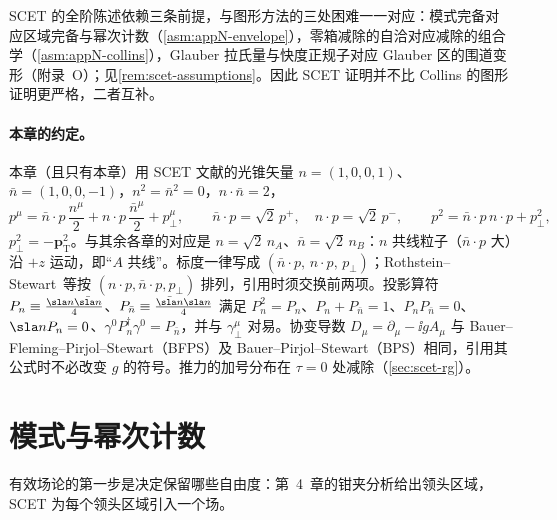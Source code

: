 SCET 的全阶陈述依赖三条前提，与图形方法的三处困难一一对应：模式完备对应区域完备与幂次计数（\cref{asm:appN-envelope}），零箱减除的自洽对应减除的组合学（\cref{asm:appN-collins}），Glauber 拉氏量与快度正规子对应 Glauber 区的围道变形（附录~O）；见\cref{rem:scet-assumptions}。因此 SCET 证明并不比 Collins 的图形证明更严格，二者互补。

\paragraph{本章的约定。}
本章（且只有本章）用 SCET 文献的光锥矢量 $n=(1,0,0,1)$、$\bar n=(1,0,0,-1)$，$n^2=\bar n^2=0$，$n\cdot\bar n=2$，
\begin{equation}\label{eq:scet-decomp}
p^\mu=\bar n\cdot p\,\frac{n^\mu}{2}+n\cdot p\,\frac{\bar n^\mu}{2}+p_\perp^\mu,\qquad
\bar n\cdot p=\sqrt2\,p^+,\quad n\cdot p=\sqrt2\,p^-,\qquad p^2=\bar n\cdot p\,n\cdot p+p_\perp^2 ,
\end{equation}
$p_\perp^2=-\bm p_{\mathrm T}^2$。与其余各章的对应是 $n=\sqrt2\,n_A$、$\bar n=\sqrt2\,n_B$：$n$ 共线粒子（$\bar n\cdot p$ 大）沿 $+z$ 运动，即“$A$ 共线”。标度一律写成 $(\bar n\cdot p,\,n\cdot p,\,p_\perp)$；Rothstein--Stewart~\cite{RothsteinStewart2016}等按 $(n\cdot p,\bar n\cdot p,p_\perp)$ 排列，引用时须交换前两项。投影算符 $P_n\equiv\frac{\sla n\bar{\sla n}}{4}$、$P_{\bar n}\equiv\frac{\bar{\sla n}\sla n}{4}$ 满足 $P_n^2=P_n$、$P_n+P_{\bar n}=1$、$P_nP_{\bar n}=0$、$\sla nP_n=0$、$\gamma^0P_n^\dagger\gamma^0=P_{\bar n}$，并与 $\gamma_\perp^\mu$ 对易。协变导数 $D_\mu=\partial_\mu-\ii gA_\mu$ 与 Bauer--Fleming--Pirjol--Stewart（BFPS）\cite{BauerEtAl2001}及 Bauer--Pirjol--Stewart（BPS）\cite{BauerPirjolStewart2002}相同，引用其公式时不必改变 $g$ 的符号。推力的加号分布在 $\tau=0$ 处减除（\cref{sec:scet-rg}）。

\section{模式与幂次计数}\label{sec:scet-modes}

有效场论的第一步是决定保留哪些自由度：第~4~章的钳夹分析给出领头区域，SCET 为每个领头区域引入一个场。

